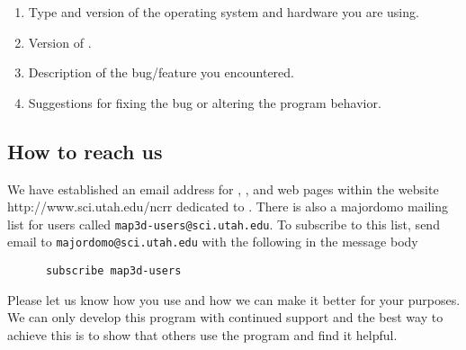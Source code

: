 \begin{enumerate}
  \item Type and version of the operating system and hardware you are using.
  \item Version of \map{}.
  \item Description of the bug/feature you encountered.
  \item Suggestions for fixing the bug or altering the program behavior.
\end{enumerate}


\subsection{How to reach us}

We have established an email address for \map{},
, and
web pages within the website 
{http://www.sci.utah.edu/ncrr} dedicated to \map{}.  There is also a
majordomo mailing list for \map{} users called
\texttt{map3d-users@sci.utah.edu}.  To subscribe to this list, send email to
\texttt{majordomo@sci.utah.edu} with the following in the message body\\
%
\begin{verbatim}
      subscribe map3d-users
\end{verbatim}

Please let us know how you use \map{} and how we can make it better for
your purposes.  We can only develop this program with continued
support and the best way to achieve this is to show that others use the
program and find it helpful.



